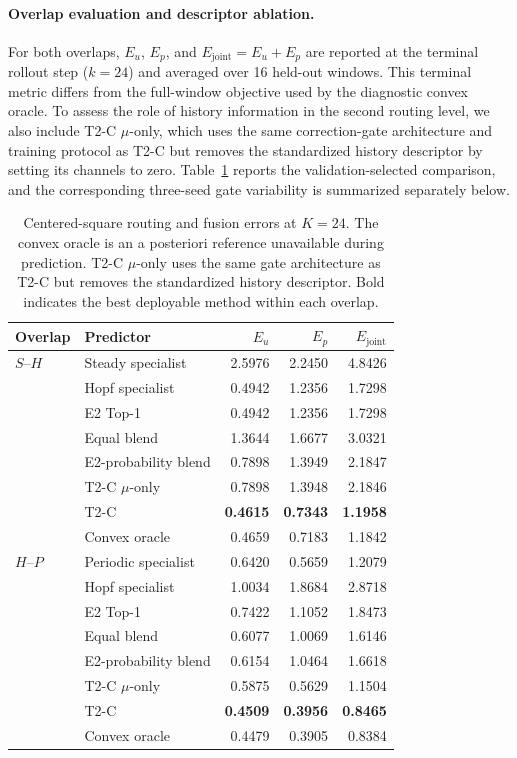 \documentclass{article}
\begin{document}
\paragraph{Overlap evaluation and descriptor ablation.}
For both overlaps, $E_u$, $E_p$, and $E_{\mathrm{joint}}=E_u+E_p$ are reported at the terminal rollout step ($k=24$) and averaged over 16 held-out windows.  This terminal metric differs from the full-window objective used by the diagnostic convex oracle. To assess the role of history information in the second routing level, we also include T2-C $\mu$-only, which uses the same correction-gate architecture and training protocol as T2-C but removes the standardized history descriptor by setting its channels to zero. Table~\ref{tab:square_fusion_full} reports the validation-selected comparison, and the corresponding three-seed gate variability is summarized separately below.

\par
\begin{table}[H]
\centering
\caption{
Centered-square routing and fusion errors at $K=24$. The convex oracle is an a posteriori reference unavailable during prediction.
T2-C $\mu$-only uses the same gate architecture as T2-C but removes the standardized history descriptor. Bold indicates the best deployable method within each overlap.
}
\label{tab:square_fusion_full}
\small
\setlength{\tabcolsep}{5pt}
\begin{tabular}{@{}llrrr@{}}
\toprule
Overlap & Predictor & $E_u$ & $E_p$ & $E_{\mathrm{joint}}$ \\
\midrule
$S$--$H$ & Steady specialist & 2.5976 & 2.2450 & 4.8426 \\
 & Hopf specialist & 0.4942 & 1.2356 & 1.7298 \\
 & E2 Top-1 & 0.4942 & 1.2356 & 1.7298 \\
 & Equal blend & 1.3644 & 1.6677 & 3.0321 \\
 & E2-probability blend & 0.7898 & 1.3949 & 2.1847 \\
 & T2-C $\mu$-only & 0.7898 & 1.3948 & 2.1846 \\
 & T2-C & \textbf{0.4615} & \textbf{0.7343} & \textbf{1.1958} \\
 & Convex oracle & 0.4659 & 0.7183 & 1.1842 \\
\midrule
$H$--$P$ & Periodic specialist & 0.6420 & 0.5659 & 1.2079 \\
 & Hopf specialist & 1.0034 & 1.8684 & 2.8718 \\
 & E2 Top-1 & 0.7422 & 1.1052 & 1.8473 \\
 & Equal blend & 0.6077 & 1.0069 & 1.6146 \\
 & E2-probability blend & 0.6154 & 1.0464 & 1.6618 \\
 & T2-C $\mu$-only & 0.5875 & 0.5629 & 1.1504 \\
 & T2-C & \textbf{0.4509} & \textbf{0.3956} & \textbf{0.8465} \\
 & Convex oracle & 0.4479 & 0.3905 & 0.8384 \\
\bottomrule
\end{tabular}
\end{table}
\par
\end{document}

